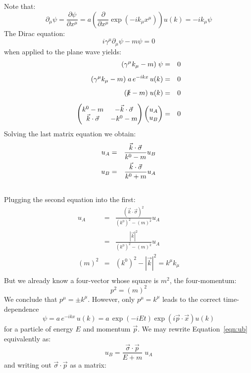 \documentclass[12pt]{article}
\begin{document}
Note that:
$$\partial_\mu \psi = \frac{\partial \psi}{\partial x^\mu} = a \left( \frac{\partial}{\partial x^\mu} \exp(-ik_\mu x^\mu)\right) u(k) = -ik_\mu \psi$$
The Dirac equation:
$$i \gamma^\mu \partial_\mu \psi - m \psi = 0$$
when applied to the plane wave yields:
\begin{eqnarray*}
( \gamma^\mu k_\mu - m) \; \psi &=& 0 \\[5pt]
( \gamma^\mu k_\mu - m) \; a \, e^{-ikx} \, u(k) &=& 0 \\[5pt]
( \slashed{k} - m) \; u(k) &=& 0 \\[5pt]
\begin{pmatrix}
 k^0-m & -  \vec{k}\cdot\vec{\sigma} \\
 \vec{k}\cdot\vec{\sigma} & - k^0-m \\
\end{pmatrix}
\begin{pmatrix}
u_A\\
u_B\\
\end{pmatrix}&=&0\\
\end{eqnarray*}
Solving the last matrix equation we obtain:
\begin{eqnarray}
u_A &=& \frac{\vec{k}\cdot\vec{\sigma}}{ k^0-m} u_B \label{eqn:ua} \\
u_B &=& \frac{\vec{k}\cdot\vec{\sigma}}{ k^0+m} u_A \label{eqn:ub} \\
\notag
\end{eqnarray}
Plugging the second equation into the first:
\begin{eqnarray*}
u_A &=& \frac{(\vec{k}\cdot\vec{\sigma})^2}{( k^0)^2-(m)^2} u_A \\
    &=& \frac{|\vec{k}|^2}{( k^0)^2-(m)^2} u_A \\
(m)^2 &=& (k^0)^2-|\vec{k}|^2 = k^\mu k_\mu \\
\end{eqnarray*}
But we already know a four-vector whose square is $m^2$, the four-momentum:
$$p^2 = (m)^2$$
We conclude that $p^\mu = \pm  k^\mu$.  However, only $p^\mu =  k^\mu$
leads to the correct time-dependence
$$\psi = a \, e^{-ikx} \, u(k) = a \, \exp(- iEt) \exp(i\vec{p}\cdot\vec{x}) u(k)$$
for a particle of energy $E$ and momentum $\vec{p}$.  We may rewrite Equation~\ref{eqn:ub} equivalently as:
\begin{equation}
\label{eqn:plane-wave-lower}
u_B = \frac{\vec{\sigma}\cdot\vec{p}}{E+m}   \; u_A
\end{equation}
and writing out $\vec{\sigma}\cdot\vec{p}$ as a matrix:
\end{document}
